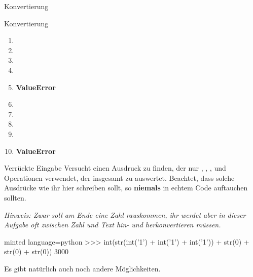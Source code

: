 \begin{task}[points=auto]{Konvertierung }
\begin{subtask*}[points=0]{Konvertierung}
        \begin{solution}
            \begin{multicols}{3}
                \begin{enumerate}
                    \item {}
                    \item {}
                    \item {}
                    \item {}
                    \item \textbf{ValueError}
                    \item {}
                    \item {}
                    \item {}
                    \item {}
                    \item \textbf{ValueError}
                \end{enumerate}
            \end{multicols}
        \end{solution}
    \end{subtask*}
    \begin{subtask*}[points=0]{Verrückte Eingabe }
        Versucht einen Ausdruck zu finden, der nur , ,
        ,  und Operationen verwendet, der
        insgesamt zu  auswertet. Beachtet, dass solche Ausdrücke
        wie ihr hier schreiben sollt, so \textbf{niemals} in echtem Code auftauchen
        sollten.

        \textit{Hinweis: Zwar soll am Ende eine Zahl rauskommen, ihr werdet aber in dieser Aufgabe oft zwischen Zahl und Text hin- und herkonvertieren müssen.}

        \begin{solution}
            \begin{codeBlock}[]{minted language=python}
                >>> int(str(int('1') + int('1') + int('1')) + str(0) + str(0) + str(0))
                3000
            \end{codeBlock}
            Es gibt natürlich auch noch andere Möglichkeiten.
        \end{solution}
    \end{subtask*}
\end{task}
